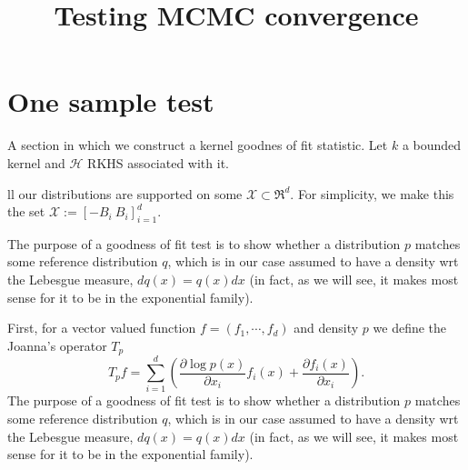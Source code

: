 \documentclass{article}
\title{Testing MCMC convergence}
\author{}
\date{}
\begin{document}
\maketitle


\section{One sample test}
A section in which we construct a kernel goodnes of fit statistic. Let $k$ a bounded kernel and $\mathcal{H}$  RKHS associated with it.


ll our distributions are supported on some $\mathcal{X}\subset\Re^{d}$.
For simplicity, we make this the set $\mathcal{X}:=[-B_{i}\: B_{i}]_{i=1}^{d}$.

The purpose of a goodness of fit test is to show whether a distribution
$p$ matches some reference distribution $q$, which is in our case
assumed to have a density wrt the Lebesgue measure, $dq(x)=q(x)dx$
(in fact, as we will see, it makes most sense for it to be in the
exponential family). 

First, for a vector valued  function $f = (f_1,\cdots,f_d)$ and density $p$ we define the Joanna's operator $T_{p}$
\[
T_{p} f=  \sum_{i=1}^{d} \left( \frac{\partial \log p(x)}{ \partial x_i} f_i(x)+\frac{\partial f_i(x)}{ \partial x_i} \right).
\]
The purpose of a goodness of fit test is to show whether a distribution
$p$ matches some reference distribution $q$, which is in our case
assumed to have a density wrt the Lebesgue measure, $dq(x)=q(x)dx$
(in fact, as we will see, it makes most sense for it to be in the
exponential family). 
\end{document}
